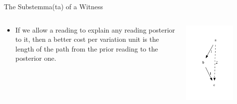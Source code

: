 \documentclass[10pt]{beamer}
\begin{document}
	\begin{frame}{The Substemma(ta) of a Witness}
		\begin{columns}
			\begin{column}{0.45\textwidth}
				\begin{itemize}
					\item If we allow a reading to explain any reading posterior to it, then a better cost per variation unit is the length of the path from the prior reading to the posterior one.
				\end{itemize}
			\end{column}
			\begin{column}{0.45\textwidth}
				\begin{center}
					\includegraphics[width=0.75\textwidth]{../img/transitivity-cost.pdf}
				\end{center}
			\end{column}
		\end{columns}
	\end{frame}
\end{document}
